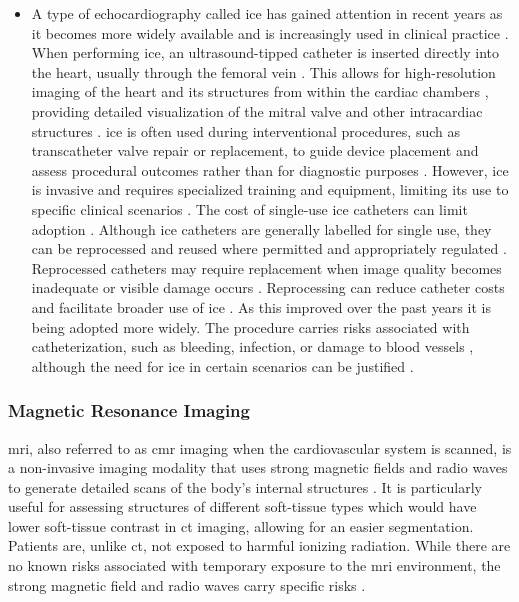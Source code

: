 \begin{itemize}
  \item [\textbf{\Gls{ice}}] A type of echocardiography called \gls{ice} has gained attention in recent years as it becomes more widely available and is increasingly used in clinical practice \cite{eleid2025scai}. When performing \gls{ice}, an ultrasound-tipped catheter is inserted directly into the heart, usually through the femoral vein \cite{eleid2025scai}. This allows for high-resolution imaging of the heart and its structures from within the cardiac chambers \cite{enriquez2018use}, providing detailed visualization of the mitral valve and other intracardiac structures \cite{eleid2025scai}. \Gls{ice} is often used during interventional procedures, such as transcatheter valve repair or replacement, to guide device placement and assess procedural outcomes rather than for diagnostic purposes \cite{eleid2025scai}. However, \gls{ice} is invasive and requires specialized training and equipment, limiting its use to specific clinical scenarios \cite{eleid2025scai}. The cost of single-use \gls{ice} catheters can limit adoption \cite{velagic2023feasibility}. Although \gls{ice} catheters are generally labelled for single use, they can be reprocessed and reused where permitted and appropriately regulated \cite{peichl2026intracardiac}. Reprocessed catheters may require replacement when image quality becomes inadequate or visible damage occurs \cite{velagic2023feasibility}. Reprocessing can reduce catheter costs and facilitate broader use of \gls{ice} \cite{peichl2026intracardiac}. As this improved over the past years it is being adopted more widely. The procedure carries risks associated with catheterization, such as bleeding, infection, or damage to blood vessels \cite{bostonUltraICEInstructions}, although the need for \gls{ice} in certain scenarios can be justified \cite{eleid2025scai}.
\end{itemize}

\subsubsection{Magnetic Resonance Imaging}\label{subsubsec:mri}
\Gls{mri}, also referred to as \gls{cmr} imaging when the cardiovascular system is scanned, is a non-invasive imaging modality that uses strong magnetic fields and radio waves to generate detailed scans of the body's internal structures \cite{mayo2023mri}. It is particularly useful for assessing structures of different soft-tissue types which would have lower soft-tissue contrast in \gls{ct} imaging, allowing for an easier segmentation. Patients are, unlike \gls{ct}, not exposed to harmful ionizing radiation. While there are no known risks associated with temporary exposure to the \gls{mri} environment, the strong magnetic field and radio waves carry specific risks \cite{fda_mri_benefits}. 


